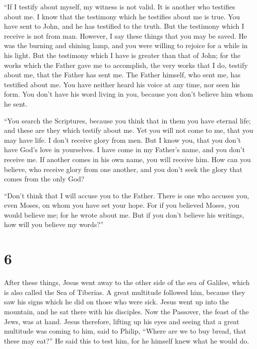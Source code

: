 ``If I testify about myself, my witness is not valid.
 It is another who testifies about me. I know that the
testimony which he testifies about me is true.  You have
sent to John, and he has testified to the truth.  But the
testimony which I receive is not from man. However, I say these things
that you may be saved.  He was the burning and shining
lamp, and you were willing to rejoice for a while in his light.
 But the testimony which I have is greater than that of
John; for the works which the Father gave me to accomplish, the very
works that I do, testify about me, that the Father has sent me.
 The Father himself, who sent me, has testified about me.
You have neither heard his voice at any time, nor seen his form.
 You don't have his word living in you, because you don't
believe him whom he sent.

 ``You search the Scriptures, because you think that in
them you have eternal life; and these are they which testify about me.
 Yet you will not come to me, that you may have life.
 I don't receive glory from men.  But I
know you, that you don't have God's love in yourselves. 
I have come in my Father's name, and you don't receive me. If another
comes in his own name, you will receive him.  How can you
believe, who receive glory from one another, and you don't seek the
glory that comes from the only God?

 ``Don't think that I will accuse you to the Father.
There is one who accuses you, even Moses, on whom you have set your
hope.  For if you believed Moses, you would believe me;
for he wrote about me.  But if you don't believe his
writings, how will you believe my words?''

\hypertarget{section-5}{%
\section{6}\label{section-5}}

 After these things, Jesus went away to the other side of
the sea of Galilee, which is also called the Sea of Tiberias.
 A great multitude followed him, because they saw his
signs which he did on those who were sick.  Jesus went up
into the mountain, and he sat there with his disciples. 
Now the Passover, the feast of the Jews, was at hand. 
Jesus therefore, lifting up his eyes and seeing that a great multitude
was coming to him, said to Philip, ``Where are we to buy bread, that
these may eat?''  He said this to test him, for he himself
knew what he would do.

